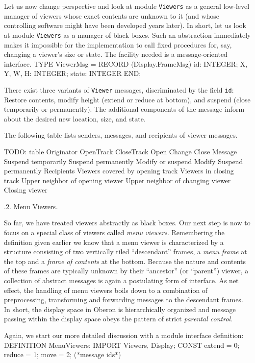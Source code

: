 Let us now change perspective and look at module {\tt Viewers\/} as a general
low-level manager of viewers whose exact contents are unknown to it
(and whose controlling software might have been developed years
later). In short, let us look at module {\tt Viewers\/} as a manager of black
boxes. Such an abstraction immediately makes it impossible for the
implementation to call fixed procedures for, say, changing a viewer's
size or state. The facility needed is a message-oriented interface.
\begintt
TYPE ViewerMsg = RECORD (Display.FrameMsg)
  id: INTEGER;
  X, Y, W, H: INTEGER;
  state: INTEGER
END;
\endtt

\noindent There exist three variants of {\tt Viewer\/} messages, discriminated by the
field {\tt id\/}: Restore contents, modify height (extend or reduce at
bottom), and suspend (close temporarily or permanently). The
additional components of the message inform about the desired new
location, size, and state.

The following table lists senders, messages, and recipients of viewer messages.

TODO: table
Originator
OpenTrack CloseTrack Open Change Close
Message
Suspend temporarily Suspend permanently Modify or suspend Modify
Suspend permanently
Recipients
Viewers covered by opening track Viewers in closing track
Upper neighbor of opening viewer Upper neighbor of changing viewer Closing viewer

.2. Menu Viewers.

So far, we have treated viewers abstractly as black boxes. Our next
step is now to focus on a special class of viewers called {\it menu viewers\/}. Remembering the definition given earlier we know that a menu
viewer is characterized by a structure consisting of two vertically
tiled ``descendant'' frames, a {\it menu frame\/} at the top and a {\it frame of contents\/} at the bottom. Because the nature and contents of these
frames are typically unknown by their ``ancestor'' (or ``parent'') viewer,
a collection of abstract messages is again a postulating form of
interface. As net effect, the handling of menu viewers boils down to a
combination of preprocessing, transforming and forwarding messages to
the descendant frames. In short, the display space in Oberon is
hierarchically organized and message passing within the display space
obeys the pattern of strict {\it parental control\/}.

Again, we start our more detailed discussion with a module interface definition:
\begintt
DEFINITION MenuViewers;
  IMPORT Viewers, Display;
  CONST extend = 0; reduce = 1; move = 2; (*message ids*)

